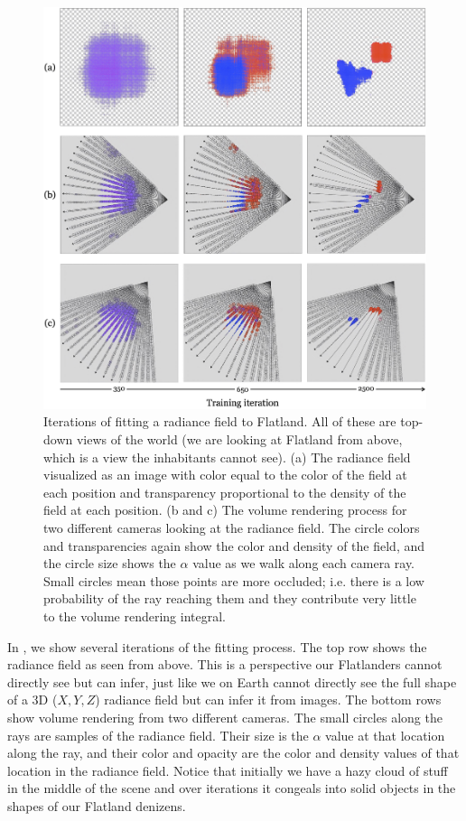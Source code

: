 \begin{figure}[t]
    \centerline{
    \includegraphics[width=.9\linewidth]{figures/nerfs/flatland_training.jpg}
    }
    \caption{Iterations of fitting a radiance field to Flatland. All of these are top-down views of the world (we are looking at Flatland from above, which is a view the inhabitants cannot see). (a) The radiance field visualized as an image with color equal to the color of the field at each position and transparency proportional to the density of the field at each position. (b and c) The volume rendering process for two different cameras looking at the radiance field. The circle colors and transparencies again show the color and density of the field, and the circle size shows the $\alpha$ value as we walk along each camera ray. Small circles mean those points are more occluded; i.e. there is a low probability of the ray reaching them and they contribute very little to the volume rendering integral.}
    \label{fig:nerfs:flatland_training}
\end{figure}

In \fig{\ref{fig:nerfs:flatland_training}}, we show several iterations of the fitting process. The top row shows the radiance field as seen from above. 
This is a perspective our Flatlanders cannot directly see but can infer, just like we on Earth cannot directly see the full shape of a 3D ($X,Y,Z$) 
radiance field but can infer it from images. The bottom rows show volume rendering from two different cameras. The small circles along the rays are samples of the radiance field. 
Their size is the $\alpha$ value at that location along the ray, and their color and opacity are the color and density values of that location in the radiance field. 
Notice that initially we have a hazy cloud of stuff in the middle of the scene and over iterations it congeals into solid objects in the shapes of our Flatland denizens. 

